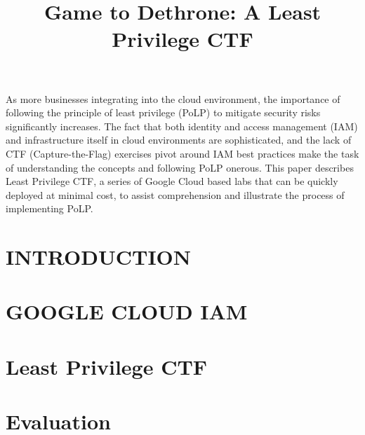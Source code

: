\documentclass[a4paper,twoside]{article}
\begin{document}
\title{Game to Dethrone: A Least Privilege CTF}


\author{
}

\abstract
{As more businesses integrating into the cloud environment, the importance of following the principle of least privilege (PoLP) to mitigate security risks significantly increases. The fact that both identity and access management (IAM) and infrastructure itself in cloud environments are sophisticated, and the lack of CTF (Capture-the-Flag) exercises pivot around IAM best practices make the task of understanding the concepts and following PoLP onerous. This paper describes Least Privilege CTF, a series of Google Cloud based labs that can be quickly deployed at minimal cost, to assist comprehension and illustrate the process of implementing PoLP.
}

\onecolumn \maketitle \normalsize \setcounter{footnote}{0} \vfill

\section{\uppercase{Introduction}}
\label{sec:introduction}



\section{\uppercase{Google Cloud IAM}}
\label{sec:gcpiam}


\section{Least Privilege CTF}
\label{sec:ctf}


\section{Evaluation}
\label{sec:eval}

\end{document}
